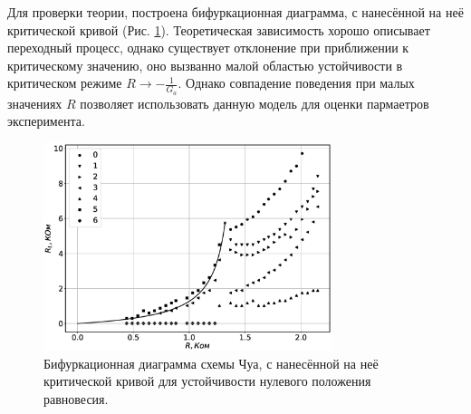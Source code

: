 \documentclass[12pt]{article}
\begin{document}
Для проверки теории, построена бифуркационная диаграмма, с нанесённой на неё критической кривой (Рис. \ref{fig:critical_line}).
Теоретическая зависимость хорошо описывает переходный процесс, однако существует отклонение при приближении к критическому значению, 
оно вызванно малой областью устойчивости в критическом режиме $R \to -\frac{1}{G_a}$. Однако совпадение поведения при малых значениях $R$ 
позволяет использовать данную модель для оценки пармаетров эксперимента. 
\begin{figure}[H]
	\centering
	\includegraphics[width=0.75\textwidth]{critical_line_teor.eps}
	\caption{Бифуркационная диаграмма схемы Чуа, с нанесённой на неё критической кривой для устойчивости нулевого положения равновесия.}
	\label{fig:critical_line}
\end{figure}
\end{document}
